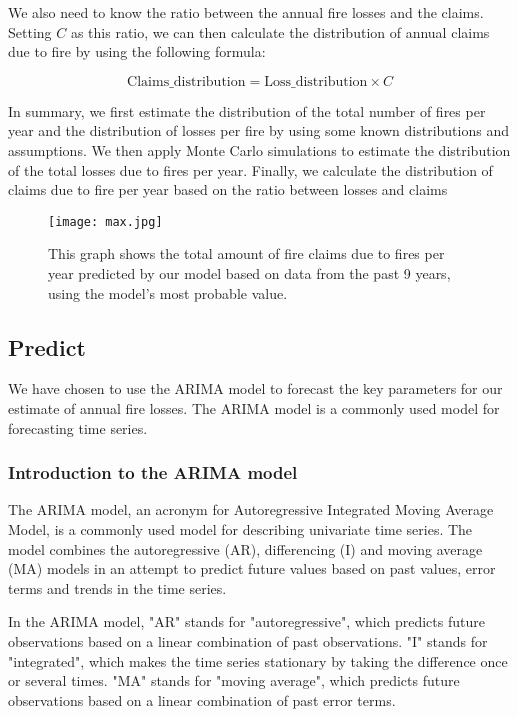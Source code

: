 \documentclass[12pt]{article}  %
\begin{document}
We also need to know the ratio between the annual fire losses and the claims. Setting $C$ as this ratio, we can then calculate the distribution of annual claims due to fire by using the following formula:

$$
\text{Claims\_distribution} = \text{Loss\_distribution} \times  C
$$

In summary, we first estimate the distribution of the total number of fires per year and the distribution of losses per fire by using some known distributions and assumptions. We then apply Monte Carlo simulations to estimate the distribution of the total losses due to fires per year. Finally, we calculate the distribution of claims due to fire per year based on the ratio between losses and claims

\begin{figure}
    \centering
    \texttt{[image: max.jpg]}
    \caption{This graph shows the total amount of fire claims due to fires per year predicted by our model based on data from the past 9 years, using the model's most probable value.}\label{fig:max}
\end{figure}

\subsection{Predict}
We have chosen to use the ARIMA model to forecast the key parameters for our estimate of annual fire losses. The ARIMA model is a commonly used model for forecasting time series.\textsuperscript{\cite{arima4, arima, arima2, arima3}}

\subsubsection{Introduction to the ARIMA model}

The ARIMA model, an acronym for Autoregressive Integrated Moving Average Model, is a commonly used model for describing univariate time series. The model combines the autoregressive (AR), differencing (I) and moving average (MA) models in an attempt to predict future values based on past values, error terms and trends in the time series.

In the ARIMA model, "AR" stands for "autoregressive", which predicts future observations based on a linear combination of past observations. "I" stands for "integrated", which makes the time series stationary by taking the difference once or several times. "MA" stands for "moving average", which predicts future observations based on a linear combination of past error terms.
\end{document}
